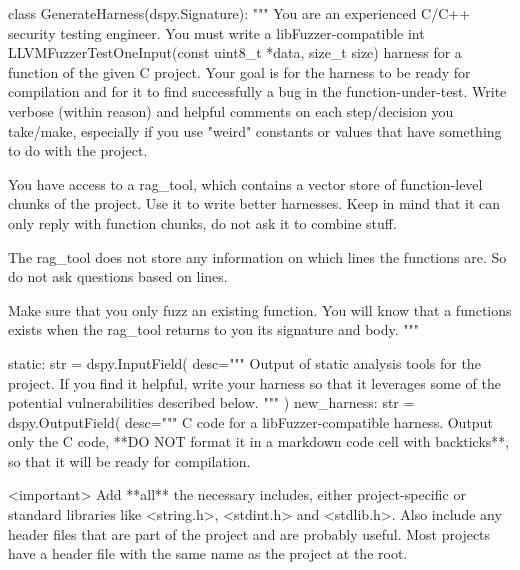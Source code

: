 \documentclass[
  a4paper,
  DIV=11,
  numbers=noendperiod]{scrreprt}
\newenvironment{Shaded}{\begin{snugshade}}{\end{snugshade}}
\newcommand{\BuiltInTok}[1]{\textcolor[rgb]{0.33,0.33,0.33}{#1}}
\newcommand{\CommentTok}[1]{\textcolor[rgb]{0.41,0.41,0.41}{#1}}
\newcommand{\KeywordTok}[1]{\textcolor[rgb]{0.85,0.12,0.09}{#1}}
\newcommand{\NormalTok}[1]{\textcolor[rgb]{0.33,0.33,0.33}{#1}}
\newcommand{\OperatorTok}[1]{\textcolor[rgb]{0.00,0.46,0.62}{#1}}
\newcommand{\StringTok}[1]{\textcolor[rgb]{0.00,0.50,0.00}{#1}}
\theoremstyle{definition}
\theoremstyle{remark}
\begin{document}
\begin{Shaded}
\begin{Highlighting}[numbers=left,,]
\KeywordTok{class}\NormalTok{ GenerateHarness(dspy.Signature):}
    \CommentTok{"""}
\CommentTok{    You are an experienced C/C++ security testing engineer. You must write a}
\CommentTok{    libFuzzer{-}compatible \textasciigrave{}int LLVMFuzzerTestOneInput(const uint8\_t *data, size\_t}
\CommentTok{    size)\textasciigrave{} harness for a function of the given C project. Your goal is for the}
\CommentTok{    harness to be ready for compilation and for it to find successfully a bug in}
\CommentTok{    the function{-}under{-}test. Write verbose (within reason) and helpful comments}
\CommentTok{    on each step/decision you take/make, especially if you use "weird" constants}
\CommentTok{    or values that have something to do with the project.}

\CommentTok{    You have access to a rag\_tool, which contains a vector store of}
\CommentTok{    function{-}level chunks of the project. Use it to write better harnesses. Keep}
\CommentTok{    in mind that it can only reply with function chunks, do not ask it to}
\CommentTok{    combine stuff.}

\CommentTok{    The rag\_tool does not store any information on which lines the functions}
\CommentTok{    are. So do not ask questions based on lines.}

\CommentTok{    Make sure that you only fuzz an existing function. You will know that a}
\CommentTok{    functions exists when the rag\_tool returns to you its signature and body.}
\CommentTok{    """}

\NormalTok{    static: }\BuiltInTok{str} \OperatorTok{=}\NormalTok{ dspy.InputField(}
\NormalTok{        desc}\OperatorTok{=}\StringTok{""" Output of static analysis tools for the project. If you find it}
\StringTok{        helpful, write your harness so that it leverages some of the potential}
\StringTok{        vulnerabilities described below.  """}
\NormalTok{    )}
\NormalTok{    new\_harness: }\BuiltInTok{str} \OperatorTok{=}\NormalTok{ dspy.OutputField(}
\NormalTok{        desc}\OperatorTok{=}\StringTok{""" C code for a libFuzzer{-}compatible harness. Output only the C}
\StringTok{        code, **DO NOT format it in a markdown code cell with backticks**, so}
\StringTok{        that it will be ready for compilation.}

\StringTok{        \textless{}important\textgreater{}}
\StringTok{        }
\StringTok{        Add **all** the necessary includes, either project{-}specific or standard}
\StringTok{        libraries like \textless{}string.h\textgreater{}, \textless{}stdint.h\textgreater{} and \textless{}stdlib.h\textgreater{}. Also include any}
\StringTok{        header files that are part of the project and are probably useful. Most}
\StringTok{        projects have a header file with the same name as the project at the}
\StringTok{        root.}


\end{Highlighting}
\end{Shaded}
\end{document}
